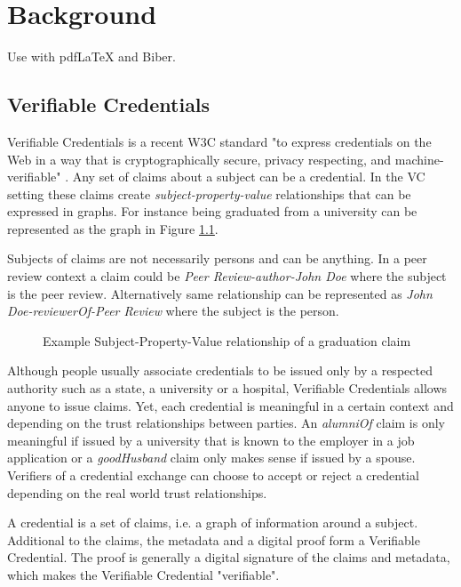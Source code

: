 
\chapter{Background}\label{chapter:background}
Use with pdfLaTeX and Biber.

\section{Verifiable Credentials}

Verifiable Credentials is a recent W3C standard "to express credentials on the Web in a way that is cryptographically secure, privacy respecting, and machine-verifiable" \parencite{Sporny.18Kas2019}. Any set of claims about a subject can be a credential. In the VC setting these claims create \textit{subject-property-value} relationships that can be expressed in graphs. For instance being graduated from a university can be represented as the graph in Figure \ref{fig:alumniOf}. 

Subjects of claims are not necessarily persons and can be anything. In a peer review context a claim could be \textit{Peer Review-author-John Doe} where the subject is the peer review. Alternatively same relationship can be represented as \textit{John Doe-reviewerOf-Peer Review} where the subject is the person.

\begin{figure}[htbp]
  \centering
  
  \caption{Example Subject-Property-Value relationship of a graduation claim \parencite{Sporny.18Kas2019}} \label{fig:alumniOf}
\end{figure}

Although people usually associate credentials to be issued only by a respected authority such as a state, a university or a hospital, Verifiable Credentials allows anyone to issue claims. Yet, each credential is meaningful in a certain context and depending on the trust relationships between parties. An \textit{alumniOf} claim is only meaningful if issued by a university that is known to the employer in a job application or a \textit{goodHusband} claim only makes sense if issued by a spouse. Verifiers of a credential exchange can choose to accept or reject a credential depending on the real world trust relationships.

A credential is a set of claims, i.e. a graph of information around a subject. Additional to the claims, the metadata and a digital proof form a Verifiable Credential. The proof is generally a digital signature of the claims and metadata, which makes the Verifiable Credential "verifiable".

